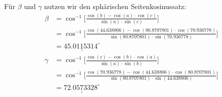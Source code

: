 Für $\beta$ und $\gamma$ nutzen wir den sphärischen Seitenkosinussatz:
\begin{align*}
	\beta &= \cos^{-1}  \bigg[\frac{\cos(b)-\cos(a) \cdot \cos(c)}{\sin(a) \cdot \sin(c)}\bigg] \\
	&= \cos^{-1}  \bigg[\frac{\cos(44.638806)-\cos(80.8707801) \cdot \cos(70.936778)}{\sin(80.8707801) \cdot \sin(70.936778)}\bigg] \\
	&= \underline{\underline{45.0115314^\circ}} 
\\
\gamma &=  \cos^{-1}  \bigg[\frac{\cos(c)-\cos(b) \cdot \cos(a)}{\sin(a) \cdot \sin(b)}\bigg] \\
	&=  \cos^{-1}  \bigg[\frac{\cos(70.936778)-\cos(44.638806) \cdot \cos(80.8707801)}{\sin(80.8707801) \cdot \sin(44.638806)}\bigg] \\
	&=\underline{\underline{72.0573328^\circ}} 
\end{align*}



